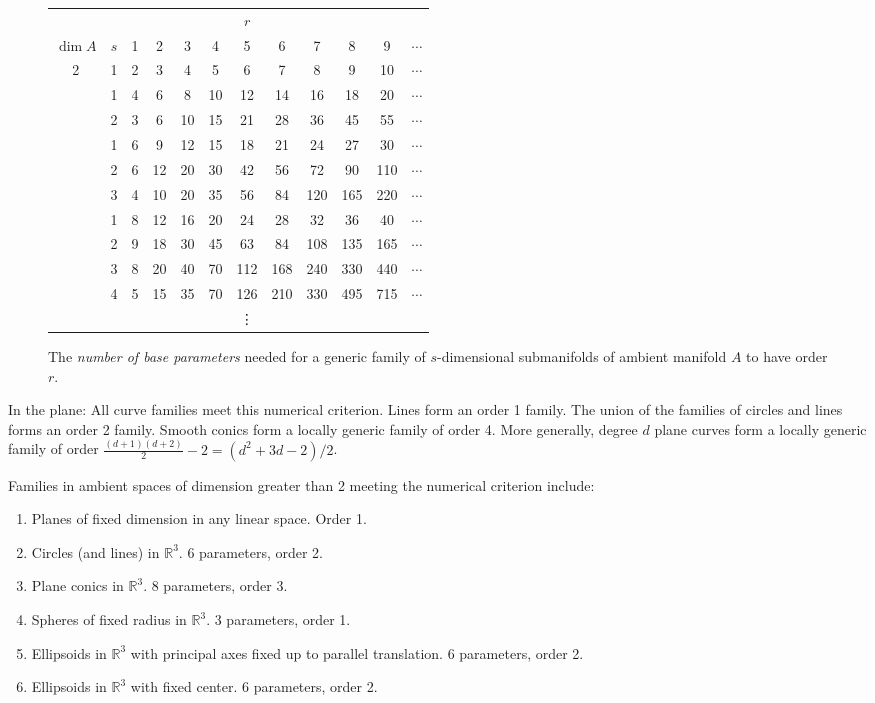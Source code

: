 \documentclass[12pt]{article}
\numberwithin{equation}{section}
\theoremstyle{plain}
\theoremstyle{definition}
\newcommand{\R}{\mathbb{R}}
\begin{document}
\begin{figure}[H]
\centering
\caption{The \emph{number of base parameters} needed for a generic family of $s$-dimensional submanifolds of ambient manifold $A$ to have order $r$.}
\begin{tabular}{ c c | c  c  c  c  c  c c c c c}
       & & & & & & $r$ & & & & &\\
$\dim A$ & $s$  &1&2&3&4&5&6&7&8&9& $\cdots$ \\
\hline
2 & 1 & 2& 3& 4& 5& 6& 7& 8& 9 &10& $\cdots$\\
\hdashline
3 & 1 & 4& 6& 8&  10& 12& 14& 16& 18& 20& $\cdots$\\
  & 2 & 3& 6& 10& 15& 21& 28& 36& 45& 55& $\cdots$\\
\hdashline
4 & 1 &6&9&12&15&18&21&24&27&30&$\cdots$\\
  & 2 &6&12&20&30&42&56&72&90&110&$\cdots$\\
  & 3 &4&10&20&35&56&84&120&165&220&$\cdots$\\
\hdashline
5 & 1 & 8 &12 &16 &20 &24  &28  &32  &36  &40 & $\cdots$\\
  & 2 & 9 &18 &30 &45 &63  &84  &108 &135 &165& $\cdots$\\
  & 3 & 8 &20 &40 &70 &112 &168 &240 &330 &440& $\cdots$\\
  & 4 & 5 &15 &35 &70 &126 &210 &330 &495 &715& $\cdots$\\
\hdashline
       & & & & & & \vdots & & & & &\\
\end{tabular}
\end{figure}

In the plane: All curve families meet this numerical criterion. Lines form an order 1 family. The union of the families of circles and lines forms an order 2 family. Smooth conics form a locally generic family of order 4. More generally, degree $d$ plane curves form a locally generic family of order $\tfrac{(d+1)(d+2)}{2}-2=(d^2+3d-2)/2$.

Families in ambient spaces of dimension greater than 2 meeting the numerical criterion include:
\begin{enumerate}
\itemsep0em
\item{Planes of fixed dimension in any linear space. Order 1.}
\item{Circles (and lines) in $\R^{3}$. 6 parameters, order 2.}
\item{Plane conics in $\R^{3}$. 8 parameters, order 3.}
\item{Spheres of fixed radius in $\R^{3}$. 3 parameters, order 1.}
\item{Ellipsoids in $\R^{3}$ with principal axes fixed up to parallel translation. 6 parameters, order 2.}
\item{Ellipsoids in $\R^{3}$ with fixed center. 6 parameters, order 2.}
\end{enumerate}
\end{document}
